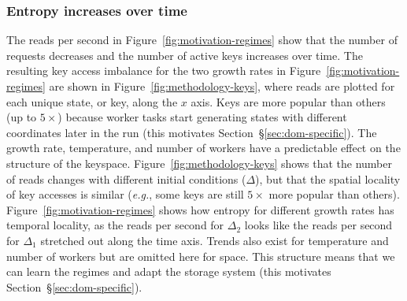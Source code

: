\subsubsection*{Entropy increases over time} The reads per second in
Figure~\ref{fig:motivation-regimes} show that the number of requests decreases
and the number of active keys increases over time. The resulting key access
imbalance for the two growth rates in Figure~\ref{fig:motivation-regimes} are
shown in Figure~\ref{fig:methodology-keys}, where reads are plotted for each
unique state, or key, along the \(x\) axis. Keys are more popular than others
(up to \(5\times\)) because worker tasks start generating states with different
coordinates later in the run (this motivates Section~\S\ref{sec:dom-specific}).
The growth rate, temperature, and number of workers have a predictable effect
on the structure of the keyspace.  Figure~\ref{fig:methodology-keys} shows that
the number of reads changes with different initial conditions (\(\Delta\)), but
that the spatial locality of key accesses is similar ({\it e.g.}, some keys are
still \(5\times\) more popular than others).
Figure~\ref{fig:motivation-regimes} shows how entropy for different growth
rates has temporal locality, as the reads per second for \(\Delta_2\) looks
like the reads per second for \(\Delta_1\) stretched out along the time axis.
Trends also exist for temperature and number of workers but are omitted here
for space. This structure means that we can learn the regimes and adapt the
storage system (this motivates Section~\S\ref{sec:dom-specific}).
